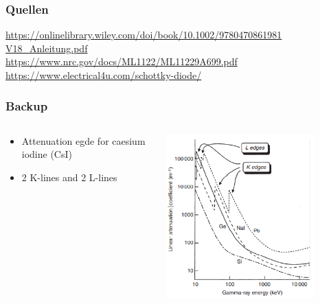 \documentclass[aspectratio=1610, 12pt]{beamer}
\begin{document}
\begin{frame}\frametitle{Quellen}
\url{https://onlinelibrary.wiley.com/doi/book/10.1002/9780470861981} \\
\url{V18_Anleitung.pdf} \\
\url{https://www.nrc.gov/docs/ML1122/ML11229A699.pdf} \\
\url{https://www.electrical4u.com/schottky-diode/} \\
\end{frame}

\begin{frame}\frametitle{Backup}
  \begin{columns}
    \begin{column}[c]{0.45\textwidth}
      \begin{itemize}
        \item Attenuation egde for caesium iodine (CsI)
        \item 2 K-lines and 2 L-lines
      \end{itemize}
    \end{column}
  \begin{column}[c]{0.45\textwidth}
    \includegraphics[width=0.8\textwidth]{plots/attenuation_edges.png}
  \end{column}
  \end{columns}
\end{frame}
\end{document}
